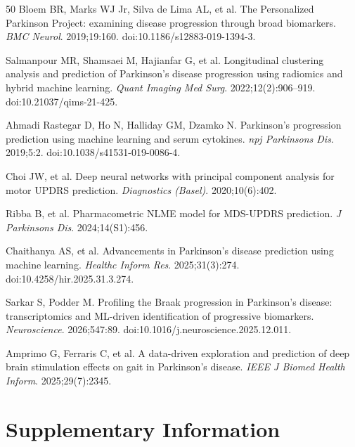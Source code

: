 \documentclass[11pt,a4paper]{article}
\begin{document}
\begin{thebibliography}{50}
Bloem BR, Marks WJ Jr, Silva de Lima AL, et al.
The Personalized Parkinson Project: examining disease progression through broad biomarkers.
\textit{BMC Neurol}. 2019;19:160.
doi:10.1186/s12883-019-1394-3.

Salmanpour MR, Shamsaei M, Hajianfar G, et al.
Longitudinal clustering analysis and prediction of Parkinson's disease progression using radiomics and hybrid machine learning.
\textit{Quant Imaging Med Surg}. 2022;12(2):906--919.
doi:10.21037/qims-21-425.

Ahmadi Rastegar D, Ho N, Halliday GM, Dzamko N.
Parkinson's progression prediction using machine learning and serum cytokines.
\textit{npj Parkinsons Dis}. 2019;5:2.
doi:10.1038/s41531-019-0086-4.

Choi JW, et al.
Deep neural networks with principal component analysis for motor UPDRS prediction.
\textit{Diagnostics (Basel)}. 2020;10(6):402.

Ribba B, et al.
Pharmacometric NLME model for MDS-UPDRS prediction.
\textit{J Parkinsons Dis}. 2024;14(S1):456.

Chaithanya AS, et al.
Advancements in Parkinson's disease prediction using machine learning.
\textit{Healthc Inform Res}. 2025;31(3):274.
doi:10.4258/hir.2025.31.3.274.

Sarkar S, Podder M.
Profiling the Braak progression in Parkinson's disease: transcriptomics and ML-driven identification of progressive biomarkers.
\textit{Neuroscience}. 2026;547:89.
doi:10.1016/j.neuroscience.2025.12.011.

Amprimo G, Ferraris C, et al.
A data-driven exploration and prediction of deep brain stimulation effects on gait in Parkinson's disease.
\textit{IEEE J Biomed Health Inform}. 2025;29(7):2345.

\end{thebibliography}

\clearpage
\appendix
\setcounter{table}{0}
\setcounter{figure}{0}
\renewcommand{\thetable}{S\arabic{table}}
\renewcommand{\thefigure}{S\arabic{figure}}

\section*{Supplementary Information}
\end{document}
